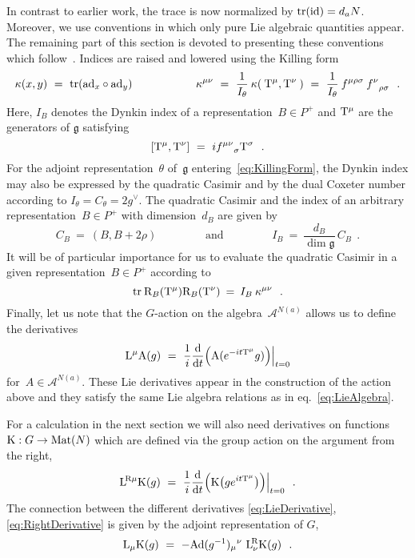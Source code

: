 \documentclass[12pt,a4paper]{article}
\newcommand{\tr}{\text{tr}}
\newcommand{\mf}{\mathfrak} %
\newcommand{\mc}{\mathcal} %
\def\reps{P^+} %
\def\Mat{{\text{\rm Mat}}} %
\def\tT{{\rm T}} %
\def\tR{{\rm R}} %
\def\tK{{\rm K}} %
\def\tA{{\rm A}}
\def\tL{{\rm L}}
\def\ad{{\rm ad}}
\def\id{{\rm id}}
\begin{document}
In contrast to earlier work, the trace is now normalized by 
$\tr(\id)=d_aN$. Moreover, we use conventions in which only pure 
Lie algebraic quantities appear. The remaining part of this 
section is devoted to presenting these conventions which 
follow~\cite{Fuchs:1995}. Indices are raised and lowered 
using the Killing form
\begin{equation}
  \label{eq:KillingForm}
  \kappa(x,y)\ =\ \tr(\ad_x\circ\ad_y)\hspace{2cm}
  \kappa^{\mu\nu}\ =\ \frac{1}{I_\theta}\:\kappa(\:\tT^\mu,\tT^\nu\:)
   \ =\ \frac{1}{I_\theta}\:f^{\mu\rho\sigma}\:{f^{\nu}}_{\rho\sigma}
 \ \ .
\end{equation}
Here, $I_B$ denotes the Dynkin index of a representation~$B\in\reps$
and $\tT^\mu$ are the generators of $\mf{g}$ satisfying
\begin{equation} 
\label{eq:LieAlgebra} 
[\tT^\mu,\tT^\nu] \ =\ i{f^{\mu\nu}}_\sigma\tT^\sigma\ \ .  
\end{equation}   
For the adjoint representation~$\theta$ of~$\mf{g}$ 
entering~\eqref{eq:KillingForm}, the Dynkin index may also be 
expressed by the quadratic Casimir and by the dual Coxeter number 
according to $I_\theta=C_\theta=2g^\vee$. The quadratic Casimir 
and the index of an  arbitrary representation~$B\in\reps$ with
dimension~$d_B$ are given by
\begin{equation}
  \label{eq:QuadraticCasimir}
  C_B \ =\ (B,B+2\rho)
  \qquad\qquad\text{ and }\qquad\qquad I_B\ =\ 
  \frac{d_B}{\dim\mf{g}}\, C_B\ \ .
\end{equation}
It will be of particular importance for us to evaluate 
the quadratic Casimir in a given representation~$B \in 
\reps$ according to 
\begin{equation}
  \label{eq:RepQuadraticCasimir}
  \tr\:\tR_B(\tT^\mu)\tR_B(\tT^\nu)\:=\:I_B\:\kappa^{\mu\nu}\ \ .
\end{equation}
Finally, let us note that the $G$-action on the 
algebra~$\mc{A}^{N(a)}$ allows us to define the derivatives
\begin{equation}
  \label{eq:LieDerivative}
  \tL^\mu\tA(g)
  \ =\ \frac{1}{i}
   \frac{\text{d}}{\text{d}t}\Bigl(\tA(e^{-it\tT^\mu}g)\Bigr)\Bigr|_{t=0}
\end{equation}
for~$A\in\mc{A}^{N(a)}$. These Lie derivatives appear in the 
construction of the action above and they satisfy the same 
Lie algebra relations as in eq.~\eqref{eq:LieAlgebra}. 

For a calculation in the next section we will also need derivatives on
functions $\tK: G\to \Mat(N)$ which are defined via the group action on the
argument from the right,
\begin{equation}
  \label{eq:RightDerivative}
  \tL^{\!\tR\mu}\tK(g)
  \ =\ \frac{1}{i}
   \frac{\text{d}}{\text{d}t}\Bigl(\tK\bigl(ge^{it\tT^\mu}\bigr)\Bigr)\Bigr|_{t=0}\ \ .
\end{equation}
The connection between the different derivatives
\eqref{eq:LieDerivative},\eqref{eq:RightDerivative} is given by the adjoint
representation of $G$,
\begin{equation}
\tL_{\mu}\tK(g)\ =\ - \text{Ad}(g^{-1}){_{\mu}}^{\nu} \ 
\tL^{\!\tR}_{\nu} \tK(g)\ \ .
\end{equation}
\end{document}
